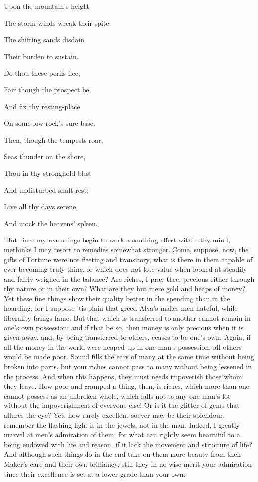 Upon the mountain's height

The storm-winds wreak their spite:

The shifting sands disdain

Their burden to sustain.

Do thou these perils flee,

Fair though the prospect be,

And fix thy resting-place

On some low rock's sure base.

Then, though the tempests roar,

Seas thunder on the shore,

Thou in thy stronghold blest

And undisturbed shalt rest;

Live all thy days serene,

And mock the heavens' spleen.


'But since my reasonings begin to work a soothing effect within thy
mind, methinks I may resort to remedies somewhat stronger. Come,
suppose, now, the gifts of Fortune were not fleeting and transitory,
what is there in them capable of ever becoming truly thine, or which
does not lose value when looked at steadily and fairly weighed in the
balance? Are riches, I pray thee, precious either through thy nature or
in their own? What are they but mere gold and heaps of money? Yet these
fine things show their quality better in the spending than in the
hoarding; for I suppose 'tis plain that greed Alva's makes men hateful,
while liberality brings fame. But that which is transferred to another
cannot remain in one's own possession; and if that be so, then money is
only precious when it is given away, and, by being transferred to
others, ceases to be one's own. Again, if all the money in the world
were heaped up in one man's possession, all others would be made poor.
Sound fills the ears of many at the same time without being broken into
parts, but your riches cannot pass to many without being lessened in the
process. And when this happens, they must needs impoverish those whom
they leave. How poor and cramped a thing, then, is riches, which more
than one cannot possess as an unbroken whole, which falls not to any one
man's lot without the impoverishment of everyone else! Or is it the
glitter of gems that allures the eye? Yet, how rarely excellent soever
may be their splendour, remember the flashing light is in the jewels,
not in the man. Indeed, I greatly marvel at men's admiration of them;
for what can rightly seem beautiful to a being endowed with life and
reason, if it lack the movement and structure of life? And although such
things do in the end take on them more beauty from their Maker's care
and their own brilliancy, still they in no wise merit your admiration
since their excellence is set at a lower grade than your own.

